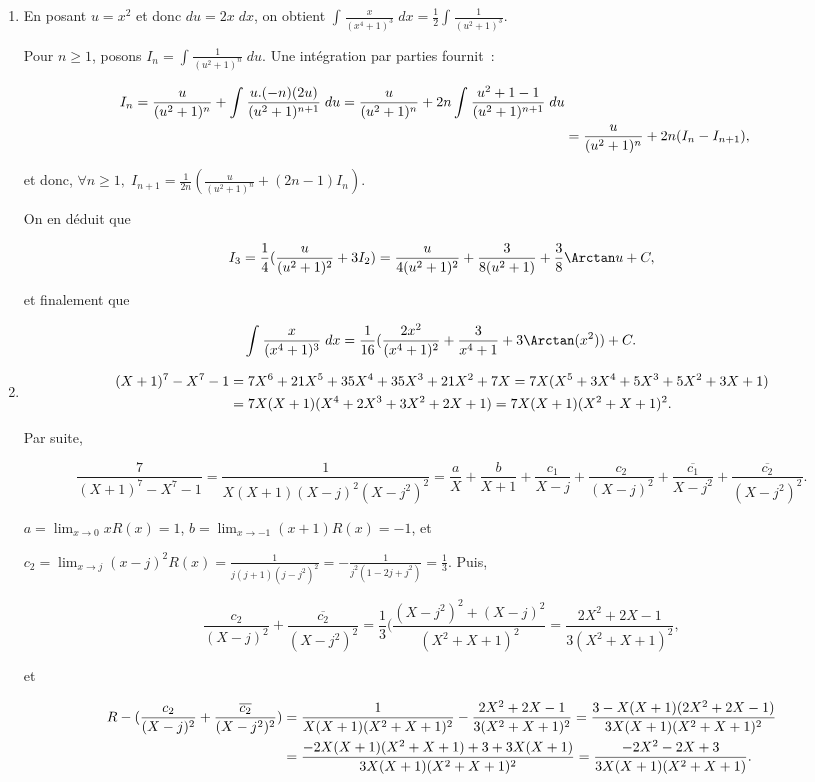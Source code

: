 {{\begin{enumerate}
\item  En posant $u=x^2$ et donc $du=2x\;dx$, on obtient $\int_{}^{}\frac{x}{(x^4+1)^3}\;dx=\frac{1}{2}\int_{}^{}\frac{1}{(u^2+1)^3}$.

Pour $n\geq1$, posons $I_n=\int_{}^{}\frac{1}{(u^2+1)^n}\;du$. Une intégration par parties fournit~:

\begin{align*}\ensuremath
I_n=\frac{u}{(u^2+1)^n}+\int_{}^{}\frac{u.(-n)(2u)}{(u^2+1)^{n+1}}\;du=\frac{u}{(u^2+1)^n}+2n\int_{}^{}\frac{u^2+1-1}{(u^2+1)^{n+1}}\;du\\
 &=\frac{u}{(u^2+1)^n}+2n(I_n-I_{n+1}),
\end{align*}

et donc, $\forall n\geq1,\;I_{n+1}=\frac{1}{2n}(\frac{u}{(u^2+1)^n}+(2n-1)I_n)$.

On en déduit que

$$I_3=\frac{1}{4}(\frac{u}{(u^2+1)^2}+3I_2)=\frac{u}{4(u^2+1)^2}+\frac{3}{8(u^2+1)}+\frac{3}{8}\Arctan u+C,$$

et finalement que

$$\int_{}^{}\frac{x}{(x^4+1)^3}\;dx=\frac{1}{16}(\frac{2x^2}{(x^4+1)^2}+\frac{3}{x^4+1}+3\Arctan(x^2))+C.$$

\item  
\begin{align*}\ensuremath
(X+1)^7-X^7-1&=7X^6+21X^5+35X^4+35X^3+21X^2+7X=7X(X^5+3X^4+5X^3+5X^2+3X+1)\\
 &=7X(X+1)(X^4+2X^3+3X^2+2X+1)=7X(X+1)(X^2+X+1)^2.
\end{align*}

Par suite,

$$\frac{7}{(X+1)^7-X^7-1}=\frac{1}{X(X+1)(X-j)^2(X-j^2)^2}=\frac{a}{X}+\frac{b}{X+1}+\frac{c_1}{X-j}
+\frac{c_2}{(X-j)^2}+\frac{\overline{c_1}}{X-j^2}+\frac{\overline{c_2}}{(X-j^2)^2}.$$

$a=\lim_{x\rightarrow 0}xR(x)=1$, $b=\lim_{x\rightarrow -1}(x+1)R(x)=-1$, et

$c_2=\lim_{x\rightarrow j}(x-j)^2R(x)=\frac{1}{j(j+1)(j-j^2)^2}=-\frac{1}{j^2(1-2j+j^2)}=\frac{1}{3}$. Puis, 

$$\frac{c_2}{(X-j)^2}+\frac{\overline{c_2}}{(X-j^2)^2}=\frac{1}{3}(\frac{(X-j^2)^2+(X-j)^2}{(X^2+X+1)^2}
=\frac{2X^2+2X-1}{3(X^2+X+1)^2},$$

et

\begin{align*}\ensuremath
R-(\frac{c_2}{(X-j)^2}+\frac{\overline{c_2}}{(X-j^2)^2})
&=\frac{1}{X(X+1)(X^2+X+1)^2}-\frac{2X^2+2X-1}{3(X^2+X+1)^2}
=\frac{3-X(X+1)(2X^2+2X-1)}{3X(X+1)(X^2+X+1)^2}\\
 &=\frac{-2X(X+1)(X^2+X+1)+3+3X(X+1)}{3X(X+1)(X^2+X+1)^2}
=\frac{-2X^2-2X+3}{3X(X+1)(X^2+X+1)}.
\end{align*}


\end{enumerate}}}

